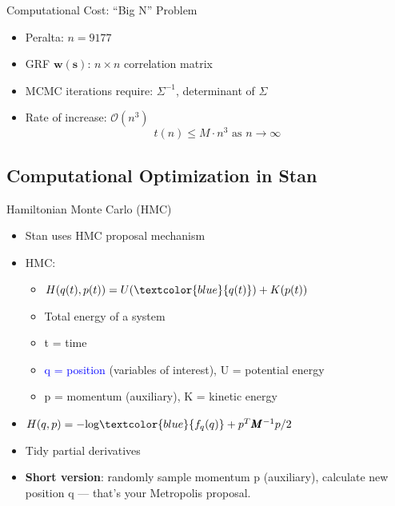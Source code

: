 \documentclass{beamer}
\begin{document}
\begin{frame}{Computational Cost: ``Big N'' Problem}{}
\begin{itemize}
\addtolength{\itemsep}{0.5\baselineskip}
\item Peralta: $n = 9177$
\item GRF $\pmb{w}(\pmb{s})$: $n \times n$ correlation matrix
\item MCMC iterations require: $\Sigma^{-1}$, determinant of $\Sigma$
\item Rate of increase: $\mathcal{O}(n^{3})$
$$t(n) \leq M \cdot n^{3} \text{ as } n \rightarrow \infty$$
\end{itemize}
\end{frame}

\subsection{Computational Optimization in Stan}

\begin{frame}{Hamiltonian Monte Carlo (HMC)}
\begin{itemize}
\addtolength{\itemsep}{0.5\baselineskip}
\item Stan uses HMC proposal mechanism
\item HMC:
  \begin{itemize}
  \addtolength{\itemsep}{0.5\baselineskip}
  \item $H(q(t),p(t)) = U(\textcolor{blue}{q(t)}) + K(p(t))$
  \item Total energy of a system
  \item t = time
  \item \textcolor{blue}{q = position} (variables of interest), U = potential energy
  \item p = momentum (auxiliary), K = kinetic energy
  \end{itemize}
\item $H(q,p) = -\text{log}\textcolor{blue}{f_{q}(q)} + p^{T}\pmb{M}^{-1}p/2$
\item Tidy partial derivatives
\item {\bf Short version}: randomly sample momentum p (auxiliary), calculate new position q  --- that's your Metropolis proposal.
\end{itemize}
\end{frame}
\end{document}
